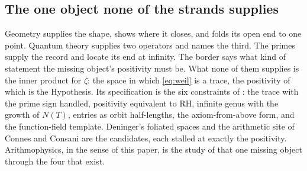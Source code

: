 \documentclass[11pt]{article}
\theoremstyle{definition}
\theoremstyle{remark}
\begin{document}
\subsection{The one object none of the strands supplies}
Geometry supplies the shape, shows where it closes, and folds its open end to one point. Quantum theory supplies two operators and names the third. The primes supply the record and locate its end at infinity. The border says what kind of statement the missing object's positivity must be. What none of them supplies is the inner product for $\zeta$: the space in which \eqref{eq:weil} is a trace, the positivity of which is the Hypothesis. Its specification is the six constraints of \cite[\S4]{horizon}: the trace with the prime sign handled, positivity equivalent to $\mathrm{RH}$, infinite genus with the growth of $N(T)$, entries as orbit half-lengths, the axiom-from-above form, and the function-field template. Deninger's foliated spaces \cite{deninger} and the arithmetic site of Connes and Consani \cite{cc16} are the candidates, each stalled at exactly the positivity. Arithmophysics, in the sense of this paper, is the study of that one missing object through the four that exist.
\end{document}
